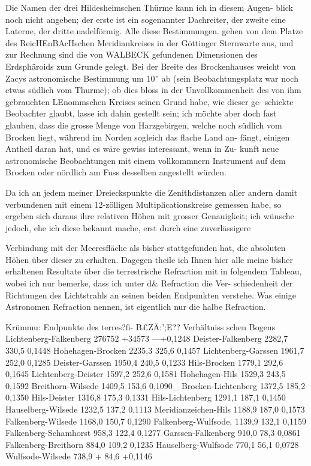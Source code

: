 \documentclass[12pt,a4paper]{article}
\theoremstyle{plain}
\theoremstyle{definition}
\theoremstyle{remark}
\begin{document}
\noindent
Die Namen der drei Hildesheimschen Thürme kann ich in diesem Augen-
blick noch nicht angeben; der erste ist ein sogenannter Dachreiter, der zweite
eine Laterne, der dritte nadelförmig. Alle diese Bestimmungen. gehen von
dem Platze des ReicHEnBAcHschen Meridiankreises in der Göttinger Sternwarte
aus, und zur Rechnung sind die von WALBECK gefundenen Dimensionen des
Erdsphäroids zum Grunde gelegt. Bei der Breite des Brockenhauses weicht
von Zacys astronomische Bestimmung um 10'' ab (sein Beobachtungsplatz war
noch etwas südlich vom Thurme); ob dies bloss in der Unvollkommenheit des
von ihm gebrauchten LEnommschen Kreises seinen Grund habe, wie dieser ge-
schickte Beobachter glaubt, lasse ich dahin gestellt sein; ich möchte aber
doch fast glauben, dass die grosse Menge von Harzgebirgen, welche noch
südlich vom Brocken liegt, während im Norden sogleich das flache Land an-
fängt, einigen Antheil daran hat, und es wäre gewiss interessant, wenn in Zu-
kunft neue astronomische Beobachtungen mit einem vollkommnern Instrument
auf dem Brocken oder nördlich am Fuss desselben angestellt würden.

\noindent
Da ich an jedem meiner Dreieckspunkte die Zenithdistanzen aller andern
damit verbundenen mit einem 12-zölligen Multiplicationskreise gemessen habe,
so ergeben sich daraus ihre relativen Höhen mit grosser Genauigkeit; ich
wünsche jedoch, ehe ich diese bekannt mache, erst durch eine zuverlässigere

\noindent

\noindent

\noindent
Verbindung mit der Meeresfläche als bisher stattgefunden hat, die absoluten
Höhen über dieser zu erhalten. Dagegen theile ich Ihnen hier alle meine
bisher erhaltenen Resultate über die terrestrische Refraction mit in folgendem
Tableau, wobei ich nur bemerke, dass ich unter d\& Refraction die Ver-
schiedenheit der Richtungen des Lichtstrahls an seinen beiden Endpunkten
verstehe. Was einige Astronomen Refraction nennen, ist eigentlich nur die
halbe Refraction.

\noindent
Krümmu:
Endpunkte des terres?fi- B£ZÄ:';E?? Verhältniss
schen Bogens
Lichtenberg-Falkenberg 276752 +34573 ---+0,1248
Deister-Falkenberg 2282,7 330,5 0,1448
Hohehagen-Brocken 2235,3 325,6 0,1457
Lichtenberg-Garssen 1961,7 252,0 0,1285
Deister-Garssen 1950,4 240,5 0,1233
Hils-Brocken 1779,1 292,6 0,1645
Lichtenberg-Deister 1597,2 252,6 0,1581
Hohehagen-Hils 1529,3 243,5 0,1592
Breithorn-Wilsede 1409,5 153,6 0,1090\_
Brocken-Lichtenberg 1372,5 185,2 0,1350
Hils-Deister 1316,8 175,3 0,1331
Hils-Lichtenberg 1291,1 187,1 0,1450
Hauselberg-Wilsede 1232,5 137,2 0,1113
Meridianzeichen-Hils 1188,9 187,0 0,1573
Falkenberg-Wilsede 1168,0 150,7 0,1290
Falkenberg-Wulfsode, 1139,9 132,1 0,1159
Falkenberg-Schamhorst 958,3 122,4 0,1277
Garssen-Falkenberg 910,0 78,3 0,0861
Falkenberg-Breithorn 884,0 109,2 0,1235
Hauselberg-Wulfsode 770,1 56,1 0,0728
Wulfsode-Wilsede 738,9 + 84,6 +0,1146

\noindent
\end{document}
